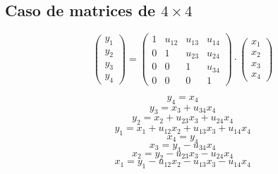 \documentclass[10pt,a4paper,dvipdfmx]{article}
\begin{document}
\subsection{Caso de matrices de $4\times 4$ }
$$ \left( 
\begin{array}{c}
y_{1} \\
y_{2} \\
y_{3} \\
y_{4} 
 \end{array}
\right)
 = \left( 
\begin{array}{cccc}
1 & u_{{1}{2}} & u_{{1}{3}} & u_{{1}{4}} \\
0 & 1 & u_{{2}{3}} & u_{{2}{4}} \\
0 & 0 & 1 & u_{{3}{4}} \\
0 & 0 & 0 & 1 
 \end{array}
\right)
 \cdot \left( 
\begin{array}{c}
x_{1} \\
x_{2} \\
x_{3} \\
x_{4} 
 \end{array}
\right)
 $$
\begin{multicols}{2}
$$ y_{4} = x_{4} $$
$$ y_{3} = x_{3} + u_{{3}{4}} x_{4} $$
$$ y_{2} = x_{2} + u_{{2}{3}} x_{3} + u_{{2}{4}} x_{4} $$
$$ y_{1} = x_{1} + u_{{1}{2}} x_{2} + u_{{1}{3}} x_{3} + u_{{1}{4}} x_{4} $$
\vfill\null
\columnbreak
$$ x_{4} = y_{4} $$
$$ x_{3} = y_{3}- u_{{3}{4}} x_{4} $$
$$ x_{2} = y_{2}- u_{{2}{3}} x_{3}- u_{{2}{4}} x_{4} $$
$$ x_{1} = y_{1}- u_{{1}{2}} x_{2}- u_{{1}{3}} x_{3}- u_{{1}{4}} x_{4} $$
\end{multicols}
\end{document}
